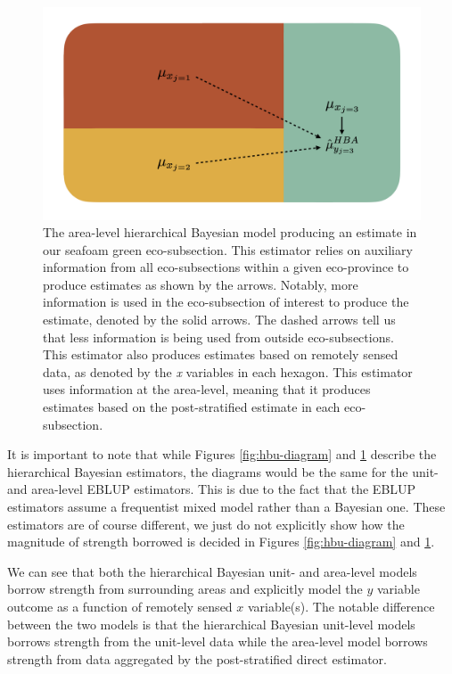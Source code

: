 \documentclass[12pt,twoside]{reedthesis}
\begin{document}
\clearpage
\begin{figure}

{\centering \includegraphics[width=1\linewidth]{figure/hba-diagram} 

}

\caption[The area-level hierarchical Bayesian model]{The area-level hierarchical Bayesian model producing an estimate in our seafoam green eco-subsection. This estimator relies on auxiliary information from all eco-subsections within a given eco-province to produce estimates as shown by the arrows. Notably, more information is used in the eco-subsection of interest to produce the estimate, denoted by the solid arrows. The dashed arrows tell us that less information is being used from outside eco-subsections. This estimator also produces estimates based on remotely sensed data, as denoted by the \textit{x} variables in each hexagon. This estimator uses information at the area-level, meaning that it produces estimates based on the post-stratified estimate in each eco-subsection.}\label{fig:hba-diagram}
\end{figure}
It is important to note that while Figures \ref{fig:hbu-diagram} and \ref{fig:hba-diagram} describe the hierarchical Bayesian estimators, the diagrams would be the same for the unit- and area-level EBLUP estimators. This is due to the fact that the EBLUP estimators assume a frequentist mixed model rather than a Bayesian one. These estimators are of course different, we just do not explicitly show how the magnitude of strength borrowed is decided in Figures \ref{fig:hbu-diagram} and \ref{fig:hba-diagram}.

We can see that both the hierarchical Bayesian unit- and area-level models borrow strength from surrounding areas and explicitly model the \(y\) variable outcome as a function of remotely sensed \(x\) variable(s). The notable difference between the two models is that the hierarchical Bayesian unit-level models borrows strength from the unit-level data while the area-level model borrows strength from data aggregated by the post-stratified direct estimator.
\end{document}
